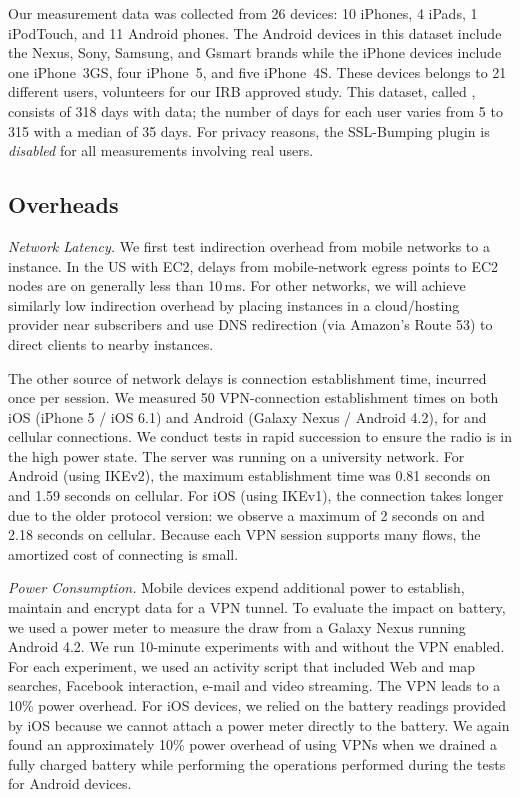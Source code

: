 Our measurement data was collected from 26 devices: 10 iPhones, 4 iPads, 1 iPodTouch, and 11
Android phones.  The Android devices in this dataset include the
Nexus, Sony, Samsung, and Gsmart brands while the iPhone devices
include one iPhone~3GS, four iPhone~5, and five iPhone~4S.  These
devices belongs to 21 different users, volunteers for our IRB approved
study.  This dataset, called \mobWild, consists of 318 days with data; the number of 
days for each user varies from 5 to 315 with a median of 35 days.  For privacy reasons, the
SSL-Bumping plugin is \emph{disabled} for all measurements involving
real users.


\subsection{Overheads}
\noindent\emph{Network Latency.}
We first test indirection overhead from mobile networks to a \meddle instance. In the 
US with EC2, delays from mobile-network egress points to EC2 nodes are on generally less than 10\,ms. 
For other networks, we will achieve similarly low indirection overhead by placing instances in a cloud/hosting 
provider near subscribers and use DNS redirection (\eg via Amazon's Route 53) to direct clients to nearby instances. 

The other source of network delays is connection establishment time, incurred once per session. We measured 
50 VPN-connection establishment times on both iOS (iPhone 5 / iOS 6.1) and Android (Galaxy Nexus /
Android 4.2), for \wifi{} and cellular connections. We conduct tests in rapid succession to ensure the radio is in the high power state.
The \meddle server was running on a university network. 
For Android (using IKEv2), the maximum establishment time was 0.81 seconds on \wifi{} and 1.59 seconds on cellular. 
For iOS (using IKEv1), the connection takes longer due to the older protocol version: we observe a maximum of 2 seconds on \wifi{} and 2.18 seconds on cellular. 
Because each VPN session supports many flows, the amortized cost of connecting is  small. 

\noindent\emph{Power Consumption.}
Mobile devices expend additional power to establish, maintain and encrypt data for a VPN tunnel. 
To evaluate the impact on battery, we used a power meter to measure the draw from a Galaxy Nexus running Android 4.2. 
We run 10-minute experiments with and without the VPN enabled. 
For each experiment, we used an activity script that included Web and map searches, Facebook interaction, e-mail and video
streaming. 
The VPN leads to a 10\% power overhead. 
For iOS devices, we relied on the battery readings provided by iOS because we cannot attach a power meter directly to the battery.
We again found an approximately 10\% power overhead of using VPNs when we drained a fully charged battery while performing the operations performed during the tests for Android devices.  

